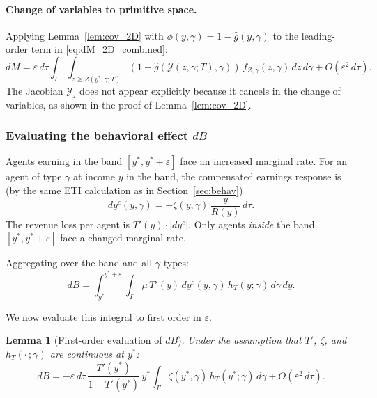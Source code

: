 \documentclass[12pt,a4paper]{article}
\theoremstyle{definition}
\theoremstyle{plain}
\newtheorem{lemma}{Lemma}[section]
\theoremstyle{remark}
\newcommand{\calY}{\mathcal{Y}}
\begin{document}
\paragraph{Change of variables to primitive space.}
Applying Lemma~\ref{lem:cov_2D} with $\phi(y,\gamma) = 1 - \hat{g}(y,\gamma)$ to the leading-order term in \eqref{eq:dM_2D_combined}:
\begin{equation}
\label{eq:dM_2D_final}
  dM = \varepsilon\,d\tau \int_{\Gamma}\int_{z \geq Z(y^*,\gamma;T)}
  (1 - \hat{g}(\calY(z,\gamma;T),\gamma))\,f_{Z,\gamma}(z,\gamma)\,dz\,d\gamma + O(\varepsilon^2\,d\tau).
\end{equation}
The Jacobian $\calY_z$ does not appear explicitly because it cancels in the change of variables, as shown in the proof of Lemma~\ref{lem:cov_2D}.

\subsubsection{Evaluating the behavioral effect $dB$}
\label{sec:2D_dB}

Agents earning in the band $[y^*,y^*+\varepsilon]$ face an increased marginal rate.  For an agent of type $\gamma$ at income $y$ in the band, the compensated earnings response is (by the same ETI calculation as in Section~\ref{sec:behav})
\begin{equation}
\label{eq:dyc_2D}
  dy^c(y,\gamma) = -\zeta(y,\gamma)\,\frac{y}{R(y)}\,d\tau.
\end{equation}
The revenue loss per agent is $T'(y) \cdot |dy^c|$.  Only agents \emph{inside} the band $[y^*,y^*+\varepsilon]$ face a changed marginal rate.

Aggregating over the band and all $\gamma$-types:
\[
  dB = \int_{y^*}^{y^*+\varepsilon}\int_{\Gamma} \mu\,T'(y)\,dy^c(y,\gamma)\,h_T(y;\gamma)\,d\gamma\,dy.
\]

We now evaluate this integral to first order in $\varepsilon$.

\begin{lemma}[First-order evaluation of $dB$]
\label{lem:dB_2D}
Under the assumption that $T'$, $\zeta$, and $h_T(\cdot\,;\gamma)$ are continuous at $y^*$:
\begin{equation}
\label{eq:dB_2D_final}
  dB = -\varepsilon\,d\tau\,\frac{T'(y^*)}{1-T'(y^*)}\,y^*\int_{\Gamma} \zeta(y^*,\gamma)\,h_T(y^*;\gamma)\,d\gamma + O(\varepsilon^2\,d\tau).
\end{equation}
\end{lemma}
\end{document}
